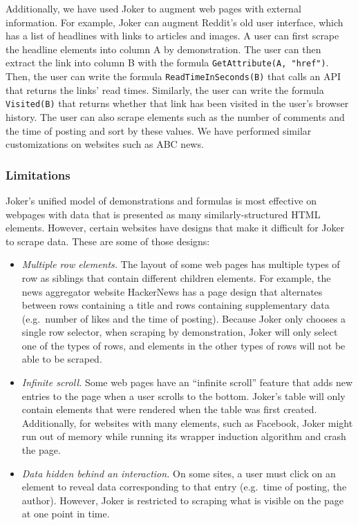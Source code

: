 \documentclass[sigconf,10pt]{acmart}
\providecommand{\tightlist}{%
  \setlength{\itemsep}{0pt}\setlength{\parskip}{0pt}}
\begin{document}
Additionally, we have used Joker to augment web pages with external
information. For example, Joker can augment Reddit's old user interface,
which has a list of headlines with links to articles and images. A user
can first scrape the headline elements into column A by demonstration.
The user can then extract the link into column B with the formula
\texttt{GetAttribute(A,\ "href")}. Then, the user can write the formula
\texttt{ReadTimeInSeconds(B)} that calls an API that returns the links'
read times. Similarly, the user can write the formula
\texttt{Visited(B)} that returns whether that link has been visited in
the user's browser history. The user can also scrape elements such as
the number of comments and the time of posting and sort by these values.
We have performed similar customizations on websites such as ABC news.

\hypertarget{limitations}{%
\subsubsection{Limitations}\label{limitations}}

Joker's unified model of demonstrations and formulas is most effective
on webpages with data that is presented as many similarly-structured
HTML elements. However, certain websites have designs that make it
difficult for Joker to scrape data. These are some of those designs:

\begin{itemize}
\tightlist
\item
  \emph{Multiple row elements.} The layout of some web pages has
  multiple types of row as siblings that contain different children
  elements. For example, the news aggregator website HackerNews has a
  page design that alternates between rows containing a title and rows
  containing supplementary data (e.g.~number of likes and the time of
  posting). Because Joker only chooses a single row selector, when
  scraping by demonstration, Joker will only select one of the types of
  rows, and elements in the other types of rows will not be able to be
  scraped.
\item
  \emph{Infinite scroll.} Some web pages have an ``infinite scroll''
  feature that adds new entries to the page when a user scrolls to the
  bottom. Joker's table will only contain elements that were rendered
  when the table was first created. Additionally, for websites with many
  elements, such as Facebook, Joker might run out of memory while
  running its wrapper induction algorithm and crash the page.
\item
  \emph{Data hidden behind an interaction.} On some sites, a user must
  click on an element to reveal data corresponding to that entry
  (e.g.~time of posting, the author). However, Joker is restricted to
  scraping what is visible on the page at one point in time.
\end{itemize}
\end{document}
